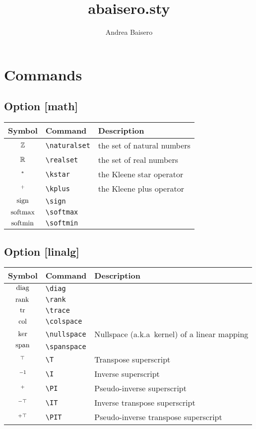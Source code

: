 \documentclass{article}
\begin{document}
\title{abaisero.sty}
\author{Andrea Baisero}

\newcommand\command[1]{\texttt{\textbackslash{#1}}}

\maketitle

\section{Commands}

\subsection*{Option [math]}

\begin{tabular}{cll}
  \toprule
  Symbol & Command & Description \\
  \midrule
  $\mathbb{Z}$ & \command{naturalset} & the set of natural numbers \\
  $\mathbb{R}$ & \command{realset} & the set of real numbers \\
  $^{*}$ & \command{kstar} & the Kleene star operator \\
  $^{+}$ & \command{kplus} & the Kleene plus operator \\
  $\operatorname{sign}$ & \command{sign} & \\
  $\operatorname*{softmax}$ & \command{softmax} & \\
  $\operatorname*{softmin}$ & \command{softmin} & \\
  \bottomrule
\end{tabular}

\subsection*{Option [linalg]}

\begin{tabular}{cll}
  \toprule
  Symbol & Command & Description \\
  \midrule
  $\operatorname*{diag}$ & \command{diag} & \\
  $\operatorname*{rank}$ & \command{rank} & \\
  $\operatorname*{tr}$ & \command{trace} & \\
  $\operatorname*{col}$ & \command{colspace} & \\
  $\operatorname*{ker}$ & \command{nullspace} & Nullspace (a.k.a\ kernel) of a linear mapping \\
  $\operatorname*{span}$ & \command{spanspace} & \\
  $^\top$ & \command{T} & Transpose superscript \\
  $^{-1}$ & \command{I} & Inverse superscript \\
  $^{+}$ & \command{PI} & Pseudo-inverse superscript \\
  $^{-\top}$ & \command{IT} & Inverse transpose superscript \\
  $^{+\top}$ & \command{PIT} & Pseudo-inverse transpose superscript \\
  \bottomrule
\end{tabular}
\end{document}
